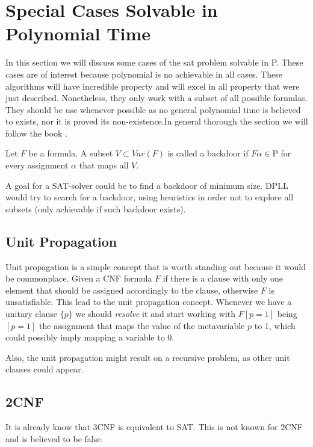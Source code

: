 
\section{Special Cases Solvable in Polynomial Time}

In this section we will discuss some cases of the sat problem solvable in P. These cases are of interest because polynomial is no achievable in all cases. These algorithms will have incredible property and will excel in all property that were just described. Nonetheless, they only work with a subset of all possible formulas. They should be use whenever possible as no general polynomial time is believed to exists, nor it is proved its non-existence.In general thorough the section we will follow the book \cite{schoning2013satisfiability}.

\begin{definition}
  Let $F$ be a formula. A subset $ V \subset Var(F)$ is called a backdoor if $F\alpha \in \text{P}$ for every assignment $\alpha$ that maps all $V$.
\end{definition}
A goal for a SAT-solver could be to find a backdoor of minimum size. DPLL would try to search for a backdoor, using heuristics in order not to explore all subsets (only achievable if such backdoor exists).
\subsection{Unit Propagation}

Unit propagation is a simple concept that is worth standing out because it would be commonplace. Given a CNF formula $F$ if there is a clause with only one element that should be assigned accordingly to the clause, otherwise $F$ is unsatisfiable. This lead to the unit propagation concept. Whenever we have a unitary clause $\{p\}$ we should \emph{resolve} it and start working with $F[p=1]$ being $[p=1]$ the assignment that maps the value of the metavariable $p$ to 1, which could possibly imply mapping a variable to $0$.

Also, the unit propagation might result on a recursive problem, as other unit clauses could appear.

\subsection{2CNF}
It is already know that 3CNF is equivalent to SAT. This is not known for 2CNF and is believed to be false.

